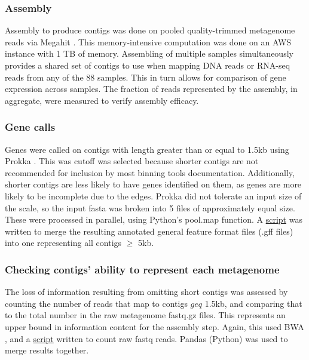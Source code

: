 \subsubsection{Assembly} %
Assembly to produce contigs was done on pooled quality-trimmed metagenome reads via Megahit \cite{li2015}.
This memory-intensive computation was done on an AWS instance with 1 TB of memory.
Assembling of multiple samples simultaneously provides a shared set of contigs to use when mapping DNA reads or RNA-seq reads from any of the 88 samples.
This in turn allows for comparison of gene expression across samples.
The fraction of reads represented by the assembly, in aggregate, were measured to verify assembly efficacy.

\subsubsection{Gene calls}
Genes were called on contigs with length greater than or equal to 1.5kb using Prokka \cite{seemann2014}.
This was cutoff was selected because shorter contigs are not recommended for inclusion by most binning tools documentation.
Additionally, shorter contigs are less likely to have genes identified on them, as genes are more likely to be incomplete due to the edges.
Prokka did not tolerate an input size of the scale, so the input fasta was broken into 5 files of approximately equal size.
These were processed in parallel, using Python's pool.map function.
A \href{https://github.com/BeckResearchLab/meta4/blob/master/m4b_binning/assembly/prokka/contigs/glue_together_gffs.py}{script} was written to merge the resulting annotated general feature format files (.gff files) into one representing all contigs $\geq$ 5kb.

\subsubsection{Checking contigs' ability to represent each metagenome}
The loss of information resulting from omitting short contigs was assessed by counting the number of reads that map to contigs $geq$ 1.5kb, and comparing that to the total number in the raw metagenome fastq.gz files.
This represents an upper bound in information content for the assembly step.
Again, this used BWA \cite{li2009}, and a \href{https://github.com/BeckResearchLab/meta4/blob/master/m4b_binning/assembly/data/sample_info/count_reads_in_each_sample.sh}{script} written to count raw fastq reads.
Pandas (Python) was used to merge results together.


